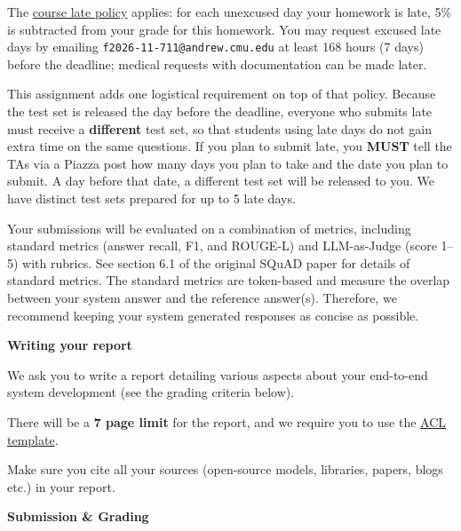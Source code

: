 \documentclass[11pt]{article}
\newcommand{\problem}[1]{%
  \vspace{1em}
  \noindent\colorbox{headerblue}{\parbox{\dimexpr\textwidth-2\fboxsep}{%
    \vspace{2pt}\textbf{\large #1}\vspace{2pt}}}
  \vspace{0.6em}
}
\newcommand{\subsec}[1]{%
  \vspace{0.8em}
  \noindent{\sffamily\bfseries\color{mauve} #1}
  \vspace{0.35em}
  \par
}
\begin{document}
\noindent The \href{https://cmu-anlp.org/syllabus/}{course late policy} applies: for each
unexcused day your homework is late, 5\% is subtracted from your grade for this homework. You may
request excused late days by emailing \texttt{f2026-11-711@andrew.cmu.edu} at least 168 hours
(7 days) before the deadline; medical requests with documentation can be made later.

\vspace{0.5em}
\noindent This assignment adds one logistical requirement on top of that policy. Because the test set
is released the day before the deadline, everyone who submits late must receive a \textbf{different}
test set, so that students using late days do not gain extra time on the same questions. If you plan
to submit late, you \textbf{MUST} tell the TAs via a Piazza post how many days you plan to take and
the date you plan to submit. A day before that date, a different test set will be released to you. We
have distinct test sets prepared for up to 5 late days.

\subsec{Evaluation metrics}

\noindent Your submissions will be evaluated on a combination of metrics, including standard metrics
(answer recall, F1, and ROUGE-L) and LLM-as-Judge (score 1--5) with rubrics. See section 6.1 of the
original SQuAD paper for details of standard metrics. The standard metrics are token-based and measure
the overlap between your system answer and the reference answer(s). Therefore, we recommend keeping
your system generated responses as concise as possible.

\problem{Writing your report}

\noindent We ask you to write a report detailing various aspects about your end-to-end system
development (see the grading criteria below).

\vspace{0.4em}
\noindent There will be a \textbf{7 page limit} for the report, and we require you to use the
\href{https://github.com/acl-org/acl-style-files}{ACL template}.

\vspace{0.4em}
\noindent Make sure you cite all your sources (open-source models, libraries, papers, blogs etc.) in
your report.

\problem{Submission \& Grading}
\end{document}
